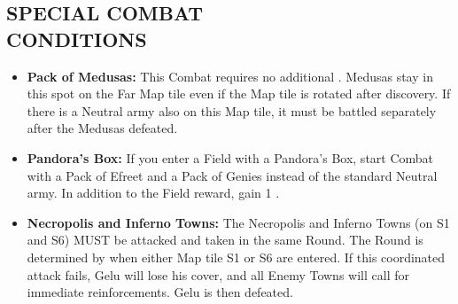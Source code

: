 \begin{multicols*}{2}
\subsection*{\MakeUppercase{Special Combat\\Conditions}}

\begin{itemize}
  \item \textbf{Pack of Medusas:} This Combat requires no additional .
    Medusas stay in this spot on the Far Map tile even if the Map tile is rotated after discovery.
    If there is a Neutral army also on this Map tile, it must be battled separately after the Medusas defeated.
  \item \textbf{Pandora’s Box:} If you enter a Field with a Pandora’s Box, start Combat with a Pack of Efreet and a Pack of Genies instead of the standard Neutral army.
    In addition to the Field reward, gain 1 .
  \item \textbf{Necropolis and Inferno Towns:} The Necropolis and Inferno Towns (on S1 and S6) MUST be attacked and taken in the same Round.
    The Round is determined by when either Map tile S1 or S6 are entered.
    If this coordinated attack fails, Gelu will lose his cover, and all Enemy Towns will call for immediate reinforcements.
    Gelu is then defeated.
\end{itemize}


\vspace*{\fill}
\begin{center}
\end{center}
\vspace*{\fill}

\end{multicols*}

